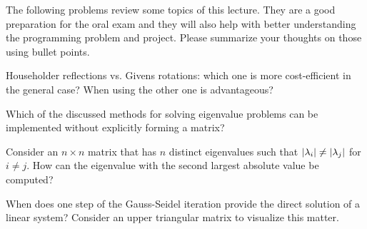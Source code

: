 
\begin{Sheet}
  \label{sheet12}

  The following problems review some topics of this lecture.
They are a good preparation for the oral exam and they will also help with better understanding the programming problem and project.
Please summarize your thoughts on those using bullet points.

  \begin{Problem}
	Householder reflections vs. Givens rotations: which one is more
	cost-efficient in the general case? When using the other one is
	advantageous?
\end{Problem}

\begin{Problem}
	Which of the discussed methods for solving eigenvalue problems can
	be implemented without explicitly forming a matrix?
\end{Problem}

\begin{Problem}
	Consider an $n\times n$ matrix that has $n$ distinct eigenvalues
	such that $\lvert\lambda_i\rvert \neq \lvert\lambda_j\rvert$ for $i\neq
	j$. How can the eigenvalue with the second largest absolute value
	be computed?
\end{Problem}

\begin{Problem}
	When does one step of the Gauss-Seidel iteration provide the
	direct solution of a linear system? Consider an upper triangular
	matrix to visualize this matter.
\end{Problem}

\end{Sheet}


